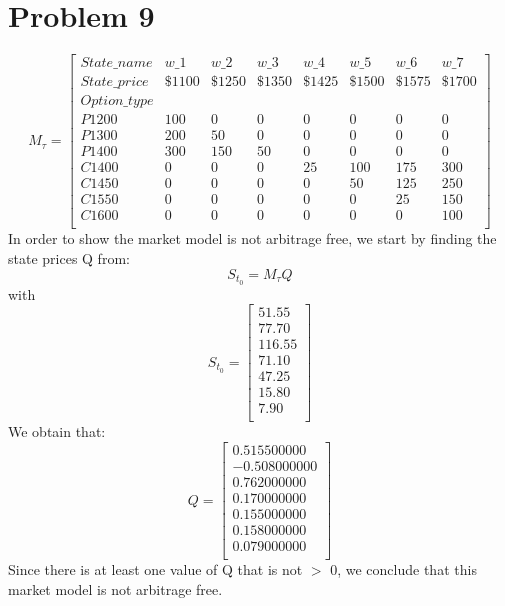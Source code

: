 \documentclass{article}
\begin{document}
\section*{Problem 9}
\begin{equation*}
M_{\tau}= %
\begin{bmatrix}{}
 State\_name & w\_1 & w\_2 & w\_3 & w\_4 & w\_5 & w\_6 & w\_7 \\ 
State\_price & \$1100 & \$1250 & \$1350 & \$1425 & \$1500 & \$1575 & \$1700  \\  
Option\_type &&&&&&\\
 P1200 &     100 &       0 &       0 &       0 &       0 &       0 &       0 \\ 
  P1300 &     200 &      50 &       0 &       0 &       0 &       0 &       0 \\ 
  P1400 &     300 &     150 &      50 &       0 &       0 &       0 &       0 \\ 
  C1400 &       0 &       0 &       0 &      25 &     100 &     175 &     300 \\ 
  C1450 &       0 &       0 &       0 &       0 &      50 &     125 &     250 \\ 
  C1550 &       0 &       0 &       0 &       0 &       0 &      25 &     150 \\ 
  C1600 &       0 &       0 &       0 &       0 &       0 &       0 &     100 \\ 
  \end{bmatrix}
\end{equation*}
In order to show the market model is not arbitrage free, we start by finding the state prices Q from:
\begin{equation*}
S_{t_{0}} = M_{\tau}Q 
\end{equation*}
with
\begin{equation*}
S_{t_{0}} = %
\begin{bmatrix}{}
 51.55 \\ 
  77.70 \\ 
  116.55 \\ 
  71.10 \\ 
  47.25 \\ 
  15.80 \\ 
  7.90 \\ 
  \end{bmatrix}
\end{equation*}
We obtain that: 
\begin{equation*}
Q = %
\begin{bmatrix}{}
  0.515500000 \\ 
  -0.508000000 \\ 
  0.762000000 \\ 
  0.170000000 \\ 
  0.155000000 \\ 
  0.158000000 \\ 
  0.079000000 \\ 
  \end{bmatrix}
\end{equation*}
Since there is at least one value of Q that is not $>$ 0, we conclude that this market model is not arbitrage free.
\end{document}

